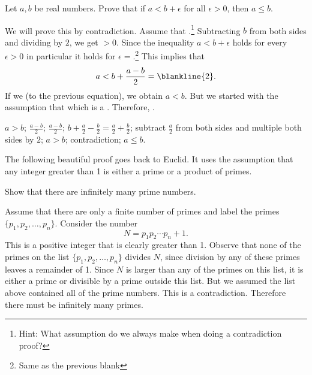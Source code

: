 \begin{fib}
Let $a, b$ be real numbers.
Prove that if  $ a < b + \epsilon$ for all $\epsilon > 0$, then $a \leq b.$
\begin{pf}
We will prove this by contradiction.  
Assume that .\footnote{Hint: What assumption do we always make when doing a contradiction proof?} 
Subtracting $b$ from both sides and dividing by $2$, we get $>0$. 
Since the inequality $a < b + \epsilon$ holds for
every $\epsilon > 0$ in particular it holds for $\epsilon=$.\footnote{Same as the previous blank} 
This implies that 
$$a < b + \frac{a - b}{2}=\blankline{2}.$$
If we  (to the previous equation), we obtain $a < b$.
But we started with the assumption that  which is a .
Therefore, .
\end{pf}
\begin{answer}
$a > b$; $\frac{a - b}{2}$; $\frac{a - b}{2}$; $b+\frac{a}{2}-\frac{b}{2}=\frac{a}{2}+\frac{b}{2}$; 
subtract $\frac{a}{2}$ from both sides and multiple both sides by $2$;
$a > b$; contradiction; $a\leq b$.
\end{answer}
\end{fib}

The following beautiful proof goes back to Euclid.
It uses the assumption that any integer greater than 1 is either a prime or a product of primes. 

\begin{exa}[Euclid]
Show that there are infinitely many prime numbers.
\label{exa:inf_primes}
\begin{pf}
Assume that there are only a finite number of primes and 
label the primes 
$\{p_1, p_2, \ldots , p_n\}$. 
Consider the number
    $$N = p_1p_2\cdots p_n + 1.$$ This is a positive integer that is clearly greater than 1. 
    Observe that none of the primes on the list $\{p_1, p_2, \ldots , p_n\}$ divides $N$, 
    since division by any of these primes
    leaves a remainder of 1. 
    Since $N$ is larger than any of the primes on this list, it is either a prime
    or divisible by a prime outside this list. 
    But we assumed the list above contained all of the prime numbers.
    This is a contradiction.  Therefore there must be infinitely many primes.
\end{pf}
\end{exa} 

